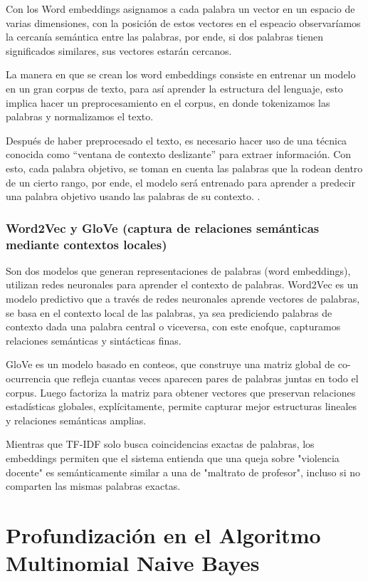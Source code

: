 Con los Word embeddings asignamos a cada palabra un vector en un espacio de varias dimensiones, con la posición de estos vectores en el espeacio observaríamos la cercanía semántica entre las palabras, por ende, si dos palabras tienen significados similares, sus vectores estarán cercanos.
 
La manera en que se crean los word embeddings consiste en entrenar un modelo en un gran corpus de texto, para así aprender la estructura del lenguaje, esto implica hacer un preprocesamiento en el corpus, en donde tokenizamos las palabras y normalizamos el texto.

Después de haber preprocesado el texto, es necesario hacer uso de una técnica conocida como “ventana de contexto deslizante” para extraer información. Con esto, cada palabra objetivo, se toman en cuenta las palabras que la rodean dentro de un cierto rango, por ende, el modelo será entrenado para aprender a predecir una palabra objetivo usando las palabras de su contexto.
.

\subsubsection{Word2Vec y GloVe (captura de relaciones semánticas mediante contextos locales)}

Son dos modelos que generan representaciones de palabras (word embeddings), utilizan redes neuronales para aprender el contexto de palabras.
Word2Vec es un modelo predictivo que a través de redes neuronales aprende vectores de palabras, se basa en el contexto local de las palabras, ya sea prediciendo palabras de contexto dada una palabra central o viceversa, con este enofque, capturamos relaciones semánticas y sintácticas finas.

GloVe es un modelo basado en conteos, que construye una matriz global de co-ocurrencia que refleja cuantas veces aparecen pares de palabras juntas en todo el corpus. Luego factoriza la matriz para obtener vectores que preservan relaciones estadísticas globales, explícitamente, permite capturar mejor estructuras lineales y relaciones semánticas amplias.

Mientras que TF-IDF solo busca coincidencias exactas de palabras, los embeddings permiten que el sistema entienda que una queja sobre "violencia docente" es semánticamente similar a una de "maltrato de profesor", incluso si no comparten las mismas palabras exactas.


\section{Profundización en el Algoritmo Multinomial Naive Bayes}

